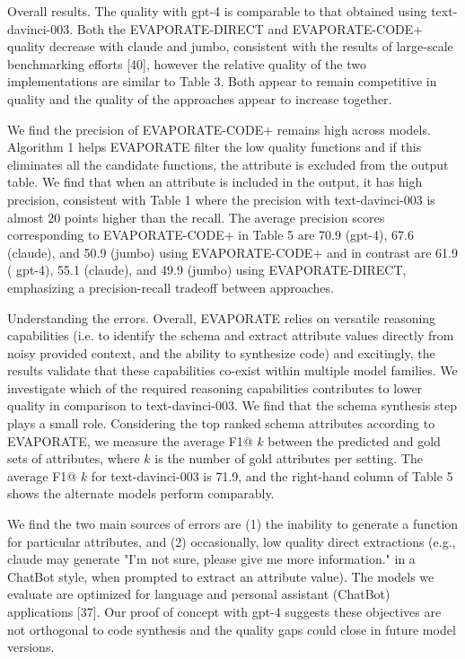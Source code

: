 \documentclass[10pt]{article}
\begin{document}
Overall results. The quality with gpt-4 is comparable to that obtained using text-davinci-003. Both the EVAPORATE-DIRECT and EVAPORATE-CODE+ quality decrease with claude and jumbo, consistent with the results of large-scale benchmarking efforts [40], however the relative quality of the two implementations are similar to Table 3. Both appear to remain competitive in quality and the quality of the approaches appear to increase together.

We find the precision of EVAPORATE-CODE+ remains high across models. Algorithm 1 helps EVAPORATE filter the low quality functions and if this eliminates all the candidate functions, the attribute is excluded from the output table. We find that when an attribute is included in the output, it has high precision, consistent with Table 1 where the precision with text-davinci-003 is almost 20 points higher than the recall. The average precision scores corresponding to EVAPORATE-CODE+ in Table 5 are 70.9 (gpt-4), 67.6 (claude), and 50.9 (jumbo) using EVAPORATE-CODE+ and in contrast are 61.9 ( gpt-4), 55.1 (claude), and 49.9 (jumbo) using EVAPORATE-DIRECT, emphasizing a precision-recall tradeoff between approaches.

Understanding the errors. Overall, EVAPORATE relies on versatile reasoning capabilities (i.e. to identify the schema and extract attribute values directly from noisy provided context, and the ability to synthesize code) and excitingly, the results validate that these capabilities co-exist within multiple model families. We investigate which of the required reasoning capabilities contributes to lower quality in comparison to text-davinci-003. We find that the schema synthesis step plays a small role. Considering the top ranked schema attributes according to EVAPORATE, we measure the average F1@ $k$ between the predicted and gold sets of attributes, where $k$ is the number of gold attributes per setting. The average F1@ $k$ for text-davinci-003 is 71.9, and the right-hand column of Table 5 shows the alternate models perform comparably.

We find the two main sources of errors are (1) the inability to generate a function for particular attributes, and (2) occasionally, low quality direct extractions (e.g., claude may generate "I'm not sure, please give me more information." in a ChatBot style, when prompted to extract an attribute value). The models we evaluate are optimized for language and personal assistant (ChatBot) applications [37]. Our proof of concept with gpt-4 suggests these objectives are not orthogonal to code synthesis and the quality gaps could close in future model versions.
\end{document}
